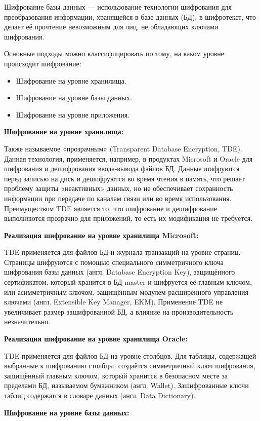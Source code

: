 Шифрование базы данных — использование технологии шифрования для преобразования информации, хранящейся в базе данных (БД), в шифротекст, что делает её прочтение невозможным для лиц, не обладающих ключами шифрования.

Основные подходы можно классифицировать по тому, на каком уровне происходит шифрование:
\begin{itemize}
    \item Шифрование на уровне хранилища.
    \item Шифрование на уровне базы данных.
    \item Шифрование на уровне приложения.
\end{itemize}

\textbf{Шифрование на уровне хранилища:}

Также называемое «прозрачным» (Transparent Database Encryption, TDE). Данная технология, применяется, например, в продуктах Microsoft и Oracle для шифрования и дешифрования ввода-вывода файлов БД. Данные шифруются перед записью на диск и дешифруются во время чтения в память, что решает проблему защиты «неактивных» данных, но не обеспечивает сохранность информации при передаче по каналам связи или во время использования. Преимуществом TDE является то, что шифрование и дешифрование выполняются прозрачно для приложений, то есть их модификация не требуется.

\textbf{Реализация шифрование на уровне хранилища Microsoft:}

TDE применяется для файлов БД и журнала транзакций на уровне страниц. Страницы шифруются с помощью специального симметричного ключа шифрования базы данных (англ. Database Encryption Key), защищённого сертификатом, который хранится в БД master и шифруется её главным ключом, или асимметричным ключом, защищённым модулем расширенного управления ключами (англ. Extensible Key Manager, EKM). Применение TDE не увеличивает размер зашифрованной БД, а влияние на производительность незначительно.

\textbf{Реализация шифрование на уровне хранилища Oracle:}

TDE применяется для файлов БД на уровне столбцов. Для таблицы, содержащей выбранные к шифрованию столбцы, создаётся симметричный ключ шифрования, защищённый главным ключом, который хранится в безопасном месте за пределами БД, называемом бумажником (англ. Wallet). Зашифрованные ключи таблиц содержатся в словаре данных (англ. Data Dictionary).

\textbf{Шифрование на уровне базы данных:}

